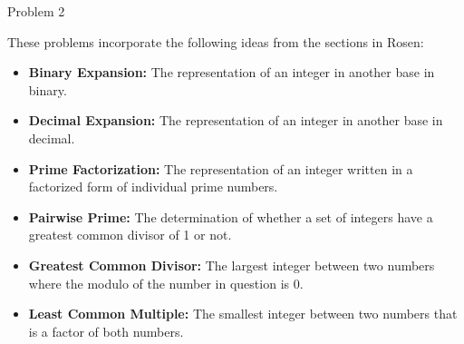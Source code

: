 \begin{problem}{Problem 2}
\begin{Highlight}[Solution]
        These problems incorporate the following ideas from the sections in Rosen:

        \begin{itemize}
            \item \textbf{Binary Expansion:} The representation of an integer in another base in binary.
            \item \textbf{Decimal Expansion:} The representation of an integer in another base in decimal.
            \item \textbf{Prime Factorization:} The representation of an integer written in a factorized form of individual prime numbers.
            \item \textbf{Pairwise Prime:} The determination of whether a set of integers have a greatest common divisor of 1 or not.
            \item \textbf{Greatest Common Divisor:} The largest integer between two numbers where the modulo of the number in question is 0.
            \item \textbf{Least Common Multiple:} The smallest integer between two numbers that is a factor of both numbers.
        \end{itemize}
    \end{Highlight}
\end{problem}

